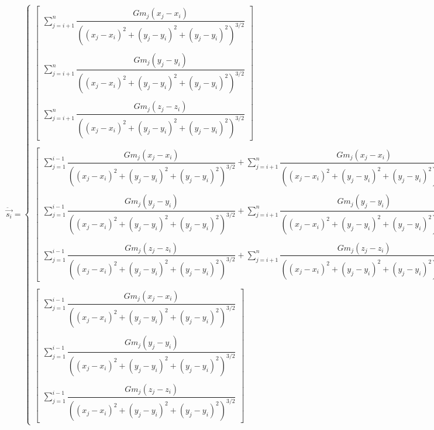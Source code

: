 \documentclass[10pt, a4paper]{amsart}
\begin{document}
\bigskip
$ \ddot \vec{s_{i}} =
    \begin{cases}
        \begin{bmatrix}
            \sum\limits_{j=i + 1}^{n} \dfrac{Gm_j(x_j - x_i)}{((x_j - x_i)^2+(y_j - y_i)^2+(y_j - y_i)^2)^{3/2}} \\ \\
            \sum\limits_{j=i + 1}^{n} \dfrac{Gm_j(y_j - y_i)}{((x_j - x_i)^2+(y_j - y_i)^2+(y_j - y_i)^2)^{3/2}} \\ \\
            \sum\limits_{j=i + 1}^{n} \dfrac{Gm_j(z_j - z_i)}{((x_j - x_i)^2+(y_j - y_i)^2+(y_j - y_i)^2)^{3/2}}
            \end{bmatrix} & \text{, } i = 1 \\ \\
        \begin{bmatrix}
            \sum\limits_{j=1}^{i - 1} \dfrac{Gm_j(x_j - x_i)}{((x_j - x_i)^2+(y_j - y_i)^2+(y_j - y_i)^2)^{3/2}} + \sum\limits_{j=i + 1}^{n} \dfrac{Gm_j(x_j - x_i)}{((x_j - x_i)^2+(y_j - y_i)^2+(y_j - y_i)^2)^{3/2}} \\ \\
            \sum\limits_{j=1}^{i - 1} \dfrac{Gm_j(y_j - y_i)}{((x_j - x_i)^2+(y_j - y_i)^2+(y_j - y_i)^2)^{3/2}} + \sum\limits_{j=i + 1}^{n} \dfrac{Gm_j(y_j - y_i)}{((x_j - x_i)^2+(y_j - y_i)^2+(y_j - y_i)^2)^{3/2}} \\ \\
            \sum\limits_{j=1}^{i - 1} \dfrac{Gm_j(z_j - z_i)}{((x_j - x_i)^2+(y_j - y_i)^2+(y_j - y_i)^2)^{3/2}} + \sum\limits_{j=i + 1}^{n} \dfrac{Gm_j(z_j - z_i)}{((x_j - x_i)^2+(y_j - y_i)^2+(y_j - y_i)^2)^{3/2}}
            \end{bmatrix} & \text{, } i \in \left[2, (n - 1)\right] \\ \\
        \begin{bmatrix}
            \sum\limits_{j=1}^{i - 1} \dfrac{Gm_j(x_j - x_i)}{((x_j - x_i)^2+(y_j - y_i)^2+(y_j - y_i)^2)^{3/2}} \\ \\
            \sum\limits_{j=1}^{i - 1} \dfrac{Gm_j(y_j - y_i)}{((x_j - x_i)^2+(y_j - y_i)^2+(y_j - y_i)^2)^{3/2}} \\ \\
            \sum\limits_{j=1}^{i - 1} \dfrac{Gm_j(z_j - z_i)}{((x_j - x_i)^2+(y_j - y_i)^2+(y_j - y_i)^2)^{3/2}}
            \end{bmatrix} & \text{, } i = n
    \end{cases} $
\bigskip
\bigskip
\end{document}
